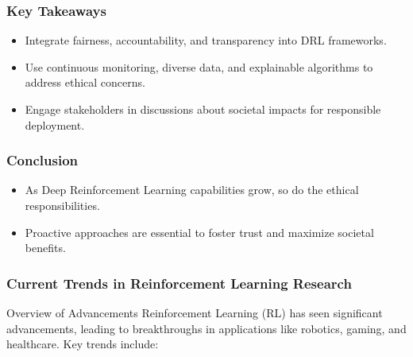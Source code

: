 \documentclass[aspectratio=169]{beamer}
\begin{document}
\begin{frame}[fragile]
    \frametitle{Key Takeaways}
    \begin{itemize}
        \item Integrate fairness, accountability, and transparency into DRL frameworks.
        \item Use continuous monitoring, diverse data, and explainable algorithms to address ethical concerns.
        \item Engage stakeholders in discussions about societal impacts for responsible deployment.
    \end{itemize}
\end{frame}

\begin{frame}[fragile]
    \frametitle{Conclusion}
    \begin{itemize}
        \item As Deep Reinforcement Learning capabilities grow, so do the ethical responsibilities.
        \item Proactive approaches are essential to foster trust and maximize societal benefits.
    \end{itemize}
\end{frame}

\begin{frame}[fragile]
    \frametitle{Current Trends in Reinforcement Learning Research}
    \begin{block}{Overview of Advancements}
        Reinforcement Learning (RL) has seen significant advancements, leading to breakthroughs in applications like robotics, gaming, and healthcare. Key trends include:
    \end{block}
\end{frame}
\end{document}
